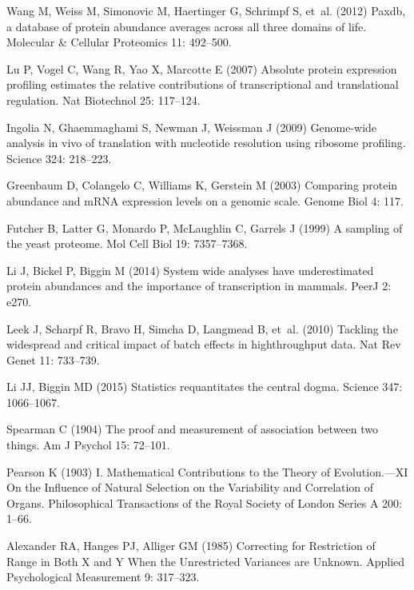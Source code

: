 \documentclass[10pt]{article}
\begin{document}
\begin{thebibliography}{10}
Wang M, Weiss M, Simonovic M, Haertinger G, Schrimpf S, et~al. (2012) Paxdb, a
  database of protein abundance averages across all three domains of life.
\newblock Molecular \& Cellular Proteomics 11: 492--500.

Lu P, Vogel C, Wang R, Yao X, Marcotte E (2007) Absolute protein expression
  profiling estimates the relative contributions of transcriptional and
  translational regulation.
\newblock Nat Biotechnol 25: 117--124.

Ingolia N, Ghaemmaghami S, Newman J, Weissman J (2009) Genome-wide analysis in
  vivo of translation with nucleotide resolution using ribosome profiling.
\newblock Science 324: 218--223.

Greenbaum D, Colangelo C, Williams K, Gerstein M (2003) Comparing protein
  abundance and {mRNA} expression levels on a genomic scale.
\newblock Genome Biol 4: 117.

Futcher B, Latter G, Monardo P, McLaughlin C, Garrels J (1999) A sampling of
  the yeast proteome.
\newblock Mol Cell Biol 19: 7357--7368.

Li J, Bickel P, Biggin M (2014) System wide analyses have underestimated
  protein abundances and the importance of transcription in mammals.
\newblock PeerJ 2: e270.

Leek J, Scharpf R, Bravo H, Simcha D, Langmead B, et~al. (2010) Tackling the
  widespread and critical impact of batch effects in highthroughput data.
\newblock Nat Rev Genet 11: 733--739.

Li JJ, Biggin MD (2015) {Statistics requantitates the central dogma}.
\newblock Science 347: 1066--1067.

Spearman C (1904) The proof and measurement of association between two things.
\newblock Am J Psychol 15: 72--101.

Pearson K (1903) {I. Mathematical Contributions to the Theory of
  Evolution.—XI On the Influence of Natural Selection on the Variability and
  Correlation of Organs}.
\newblock Philosophical Transactions of the Royal Society of London Series A
  200: 1--66.

Alexander RA, Hanges PJ, Alliger GM (1985) {Correcting for Restriction of Range
  in Both X and Y When the Unrestricted Variances are Unknown}.
\newblock Applied Psychological Measurement 9: 317--323.


\end{thebibliography}
\end{document}
